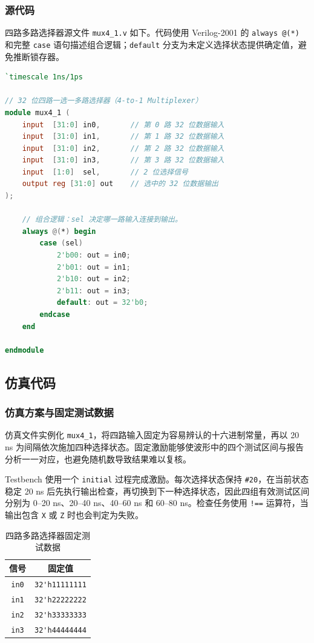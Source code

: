 \subsubsection{源代码}

四路多路选择器源文件 \verb|mux4_1.v| 如下。代码使用 Verilog-2001 的 \verb|always @(*)| 和完整 \verb|case| 语句描述组合逻辑；\verb|default| 分支为未定义选择状态提供确定值，避免推断锁存器。

\begin{lstlisting}[language=Verilog,escapeinside={}]
`timescale 1ns/1ps

// 32 位四路一选一多路选择器（4-to-1 Multiplexer）
module mux4_1 (
    input  [31:0] in0,       // 第 0 路 32 位数据输入
    input  [31:0] in1,       // 第 1 路 32 位数据输入
    input  [31:0] in2,       // 第 2 路 32 位数据输入
    input  [31:0] in3,       // 第 3 路 32 位数据输入
    input  [1:0]  sel,       // 2 位选择信号
    output reg [31:0] out    // 选中的 32 位数据输出
);

    // 组合逻辑：sel 决定哪一路输入连接到输出。
    always @(*) begin
        case (sel)
            2'b00: out = in0;
            2'b01: out = in1;
            2'b10: out = in2;
            2'b11: out = in3;
            default: out = 32'b0;
        endcase
    end

endmodule
\end{lstlisting}

\subsection{仿真代码}

\subsubsection{仿真方案与固定测试数据}

仿真文件实例化 \verb|mux4_1|，将四路输入固定为容易辨认的十六进制常量，再以 20 ns 为间隔依次施加四种选择状态。固定激励能够使波形中的四个测试区间与报告分析一一对应，也避免随机数导致结果难以复核。

Testbench 使用一个 \verb|initial| 过程完成激励。每次选择状态保持 \verb|#20|，在当前状态稳定 20 ns 后先执行输出检查，再切换到下一种选择状态，因此四组有效测试区间分别为 0--20 ns、20--40 ns、40--60 ns 和 60--80 ns。检查任务使用 \verb|!==| 运算符，当输出包含 \verb|X| 或 \verb|Z| 时也会判定为失败。

\begin{table}[H]
    \centering
    \caption{四路多路选择器固定测试数据}
    \label{tab:mux4_data}
    \begin{tabular}{c|c}
        \hline
        信号 & 固定值 \\
        \hline
        \verb|in0| & \verb|32'h11111111| \\
        \verb|in1| & \verb|32'h22222222| \\
        \verb|in2| & \verb|32'h33333333| \\
        \verb|in3| & \verb|32'h44444444| \\
        \hline
    \end{tabular}
\end{table}

